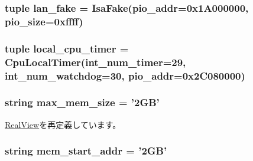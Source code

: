 \label{classRealView_1_1VExpress__EMM_a58c42fcf23ff778110e667e2df1fbb6f}
\hypertarget{classRealView_1_1VExpress__EMM_a3a27dd3a4703e03c24a604aa3c577004}{
\subsubsection[{lan\_\-fake}]{\setlength{\rightskip}{0pt plus 5cm}tuple {\bf lan\_\-fake} = {\bf IsaFake}(pio\_\-addr=0x1A000000, pio\_\-size=0xffff)}}
\label{classRealView_1_1VExpress__EMM_a3a27dd3a4703e03c24a604aa3c577004}
\hypertarget{classRealView_1_1VExpress__EMM_a4fac58dbb9d72c639bc0d5836e2e1252}{
\subsubsection[{local\_\-cpu\_\-timer}]{\setlength{\rightskip}{0pt plus 5cm}tuple {\bf local\_\-cpu\_\-timer} = {\bf CpuLocalTimer}(int\_\-num\_\-timer=29, int\_\-num\_\-watchdog=30, pio\_\-addr=0x2C080000)}}
\label{classRealView_1_1VExpress__EMM_a4fac58dbb9d72c639bc0d5836e2e1252}
\hypertarget{classRealView_1_1VExpress__EMM_ad117287c3578a335336372971d237cce}{
\subsubsection[{max\_\-mem\_\-size}]{\setlength{\rightskip}{0pt plus 5cm}string {\bf max\_\-mem\_\-size} = '2GB'}}
\label{classRealView_1_1VExpress__EMM_ad117287c3578a335336372971d237cce}


\hyperlink{classRealView_1_1RealView_af983c75b7dafe291aeab929eb0dc7656}{RealView}を再定義しています。\hypertarget{classRealView_1_1VExpress__EMM_a36ef458632b618b443f831f05ce3296e}{
\subsubsection[{mem\_\-start\_\-addr}]{\setlength{\rightskip}{0pt plus 5cm}string {\bf mem\_\-start\_\-addr} = '2GB'}}
\label{classRealView_1_1VExpress__EMM_a36ef458632b618b443f831f05ce3296e}


